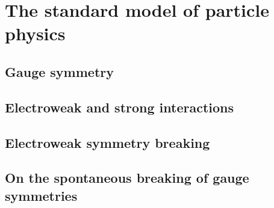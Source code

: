 \chapter{The standard model of particle physics}




\section{Gauge symmetry}



\section{Electroweak and strong interactions}



\section{Electroweak symmetry breaking}



\section{On the spontaneous breaking of gauge symmetries}



